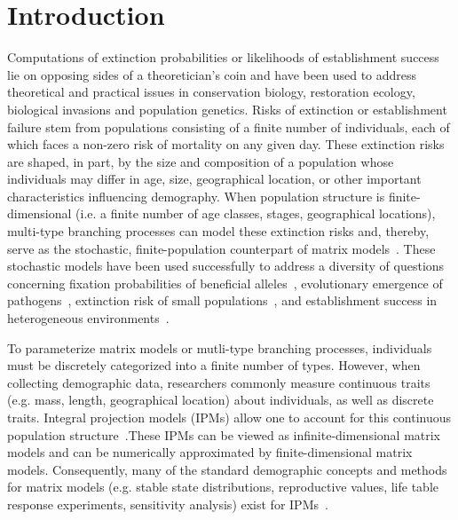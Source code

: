 \documentclass[12pt]{amsart}\usepackage[]{graphicx}\usepackage[]{color}
\begin{document}
\section*{Introduction}
Computations of extinction probabilities or likelihoods of establishment success lie on opposing sides of a theoretician's coin and have been used to address theoretical and practical issues in conservation biology, restoration ecology, biological invasions and population genetics. Risks of extinction or establishment failure stem from populations consisting of a finite number of individuals, each of which faces a non-zero risk of mortality on any given day. These extinction risks are shaped, in part, by the size and composition of a population whose individuals may differ in age, size, geographical location, or other important characteristics influencing demography. When population structure is finite-dimensional (i.e. a finite number of age classes, stages, geographical locations), multi-type branching processes can model these extinction risks and, thereby, serve as the stochastic, finite-population counterpart of matrix models~\citep{harris-63,athreya-ney-04,caswell-01,haccou-etal-05}. These stochastic models have been used successfully to address a diversity of questions concerning fixation probabilities of beneficial alleles~\citep{patwa-wahl-08}, evolutionary emergence of pathogens~\citep{antia-etal-03,ptrb-13}, extinction risk of small populations~\citep{boyce-92,gosselin-lebreton-00,fujiwara-caswell-01,erickson-etal-15}, and establishment success in heterogeneous environments~\citep{haccou-iwasa-96,haccou-vatunin-03,amnat-09b}.

To parameterize matrix models or mutli-type branching processes, individuals must be discretely categorized into a finite number of types. However, when collecting demographic data, researchers commonly measure continuous traits (e.g. mass, length, geographical location) about individuals, as well as discrete traits. Integral projection models (IPMs) allow one to account for this continuous population structure~\citep{easterling-etal-00}.These IPMs can be viewed as infinite-dimensional matrix models and can be numerically approximated by finite-dimensional matrix models. Consequently, many of the standard demographic concepts and methods for matrix models (e.g. stable state distributions, reproductive values, life table response experiments, sensitivity analysis) exist for IPMs~\citep{easterling-etal-00,rees-ellner-09,coulson-12,tpb-12,metcalf-etal-13,rees-etal-14,merow-etal-14}.
\end{document}
